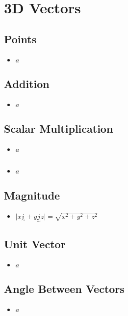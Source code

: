 \documentclass{report}
\newcommand{\vtilde}[1]{\underset{\sim}{#1}}
\newcommand{\vtildeset}[2]{#1\vtilde{i}+#2\vtilde{j}}
\newcommand{\abs}[1]{\mathopen|#1\mathclose|}
\begin{document}
    \chapter{3D Vectors}
        \section{Points}
            \begin{itemize}
                \item $a$
            \end{itemize}
        \section{Addition}
            \begin{itemize}
                \item $a$
            \end{itemize}
        \section{Scalar Multiplication}
            \begin{itemize}
                \item $a$
            \end{itemize}
        \section{}
            \begin{itemize}
                \item $a$
            \end{itemize}
        \section{Magnitude}
            \begin{itemize}
                \item $\abs{\vtildeset{x}{y}{z}}=\sqrt{x^{2}+y^{2}+z^{2}}$
            \end{itemize}
        \section{Unit Vector}
            \begin{itemize}
                \item $a$
            \end{itemize}
        \section{Angle Between Vectors}
            \begin{itemize}
                \item $a$
            \end{itemize}
\end{document}
